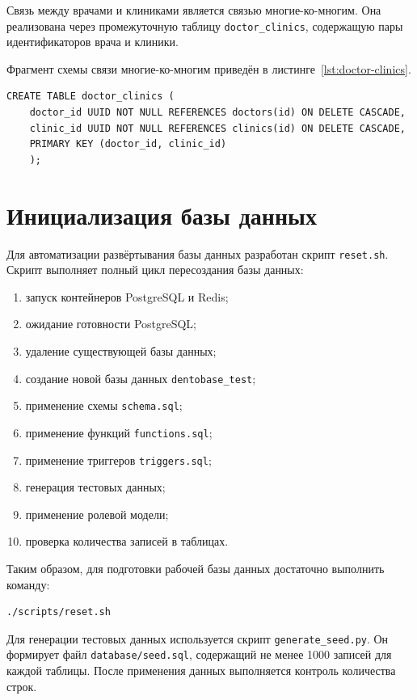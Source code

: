 Связь между врачами и клиниками является связью многие-ко-многим. Она реализована через промежуточную таблицу \texttt{doctor\_clinics}, содержащую пары идентификаторов врача и клиники.

Фрагмент схемы связи многие-ко-многим приведён в листинге~\ref{lst:doctor-clinics}.

\begin{lstlisting}[caption={Реализация связи многие-ко-многим между врачами и клиниками}, label={lst:doctor-clinics}]
	CREATE TABLE doctor_clinics (
	doctor_id UUID NOT NULL REFERENCES doctors(id) ON DELETE CASCADE,
	clinic_id UUID NOT NULL REFERENCES clinics(id) ON DELETE CASCADE,
	PRIMARY KEY (doctor_id, clinic_id)
	);
\end{lstlisting}

\section{Инициализация базы данных}

Для автоматизации развёртывания базы данных разработан скрипт \texttt{reset.sh}. Скрипт выполняет полный цикл пересоздания базы данных:

\begin{enumerate}
	\item запуск контейнеров PostgreSQL и Redis;
	\item ожидание готовности PostgreSQL;
	\item удаление существующей базы данных;
	\item создание новой базы данных \texttt{dentobase\_test};
	\item применение схемы \texttt{schema.sql};
	\item применение функций \texttt{functions.sql};
	\item применение триггеров \texttt{triggers.sql};
	\item генерация тестовых данных;
	\item применение ролевой модели;
	\item проверка количества записей в таблицах.
\end{enumerate}

Таким образом, для подготовки рабочей базы данных достаточно выполнить команду:

\begin{lstlisting}[caption={Полное пересоздание базы данных}]
	./scripts/reset.sh
\end{lstlisting}

Для генерации тестовых данных используется скрипт \texttt{generate\_seed.py}. Он формирует файл \texttt{database/seed.sql}, содержащий не менее 1000 записей для каждой таблицы. После применения данных выполняется контроль количества строк.


